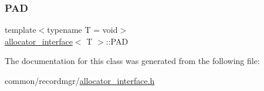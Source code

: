 \mbox{\label{classallocator__interface_adb492ef9e40efcb500c83d93a5efe6cf}} 
\subsubsection{\texorpdfstring{P\+AD}{PAD}}
{\footnotesize\ttfamily template$<$typename T  = void$>$ \\
\hyperlink{classallocator__interface}{allocator\+\_\+interface}$<$ T $>$\+::P\+AD}



The documentation for this class was generated from the following file\+:\begin{DoxyCompactItemize}
\item 
common/recordmgr/\hyperlink{allocator__interface_8h}{allocator\+\_\+interface.\+h}\end{DoxyCompactItemize}
